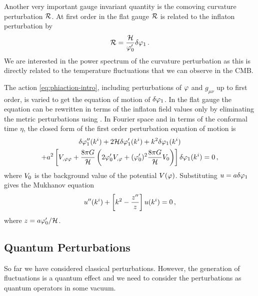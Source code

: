 Another very important gauge invariant quantity is the comoving curvature
perturbation $\mathcal{R}$. At first order in the flat gauge $\mathcal{R}$ is related to the
inflaton perturbation by \cite{Malik:2008im}
% 
\begin{equation}
\label{eq:flatRdefn-intro}
 \mathcal{R} = \frac{\mathcal{H}}{\varphi_0'}\delta\varphi_{1}\,.
\end{equation}
% 
We are interested in the power spectrum of the curvature perturbation as this
is directly related to the temperature fluctuations that we can observe in the
CMB. 

The action \eqref{eq:phiaction-intro},
including perturbations of $\varphi$ and $g_{\mu\nu}$ up to first order, is
varied to get the equation of motion of $\delta\varphi_{1}$. 
In the flat gauge the equation can be rewritten in terms of the inflaton field
values only by eliminating the metric perturbations using
. 
% 
In Fourier space and in terms of the conformal time $\eta$, the closed form of
the first order perturbation equation of motion is \cite{Malik:2008im}
% 
\begin{multline}
\label{eq:fokg-intro}
\delta\varphi_{1}''(k^i) + 2\mathcal{H} \delta\varphi_{1}'(k^i) + k^2\delta\varphi_{1}(k^i) \\
+ a^2 \left[V_{,\varphi\varphi} +
\frac{8\pi G}{\mathcal{H}}\left(2\varphi_{0}' V_{,\varphi} + (\varphi_{0}')^2\frac{8\pi G
}{\mathcal{H}}V_{0}\right)\right]\delta\varphi_{1}(k^i) = 0 \,,
\end{multline}
% 
where $V_{0}$ is the background value of the potential $V(\varphi)$.
% 
Substituting $u=a\delta\varphi_{1}$ gives the Mukhanov equation \cite{Mukhanov:1990me}
% 
\begin{equation}
 \label{eq:ueq-intro}
 u''(k^i) + \left[ k^2 -\frac{z''}{z}\right]u(k^i) = 0\,,
\end{equation}
% 
where $z= a\varphi_0'/\mathcal{H}$.

\subsection{Quantum Perturbations}
So far we have considered classical perturbations. However, the generation of
fluctuations is a quantum effect and we need to consider the
perturbations as quantum operators in some vacuum. 

